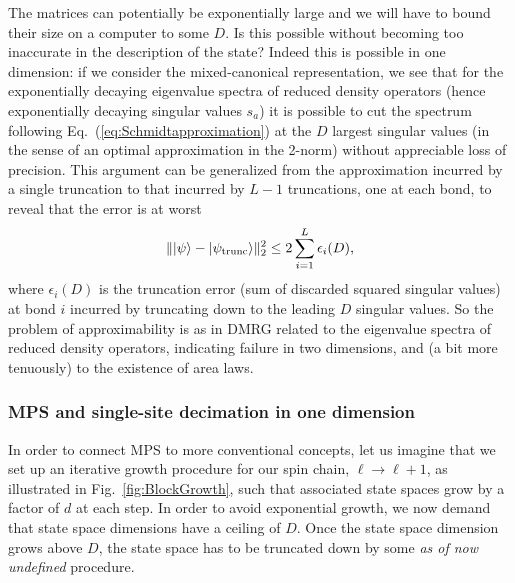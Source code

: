 \documentclass[a4paper,10pt,oneside,onecolumn,1p,times]{elsarticle}
\newcommand{\ket}[1]{\mbox{$| #1  \rangle$}}
\begin{document}
The matrices can potentially be exponentially large and we will have to bound their size on a computer to some $D$. Is this possible without becoming too inaccurate in the description of the state? Indeed this is possible in one dimension: if we consider the mixed-canonical representation, we see that for the exponentially decaying eigenvalue spectra of reduced density operators (hence exponentially decaying singular values $s_a$) it is possible to cut the spectrum following Eq.~(\ref{eq:Schmidtapproximation}) at the $D$ largest singular values (in the sense of an optimal approximation in the 2-norm) without appreciable loss of precision. This argument can be generalized from the approximation incurred by a single truncation to that incurred by $L-1$ truncations, one at each bond, to reveal that the error is at worst \cite{Verstraete06}
\begin{equation}
\| \ket{\psi} - \ket{\psi_{{\rm trunc}}} \|_2^2 \leq 2 \sum_{i=1}^L \epsilon_i(D) ,
\end{equation}
where $\epsilon_i(D)$ is the truncation error (sum of discarded squared singular values) at bond $i$ incurred by truncating down to the leading $D$ singular values. So the problem of approximability is as in DMRG related to the eigenvalue spectra of reduced density operators, indicating failure in two dimensions, and (a bit more tenuously) to the existence of area laws.

\subsubsection{MPS and single-site decimation in one dimension}
\label{subsubsec:MPSsinglesitedecimation}

In order to connect MPS to more conventional concepts, let us imagine that we set up an iterative growth procedure for our spin chain, $\ell \rightarrow \ell + 1$, as illustrated in Fig.~\ref{fig:BlockGrowth}, such that associated state spaces grow by a factor of $d$ at each step. In order to avoid exponential growth, we now demand that state space dimensions have a ceiling of $D$. Once the state space dimension grows above $D$, the state space has to be truncated down by some {\em as of now undefined} procedure.
\end{document}
